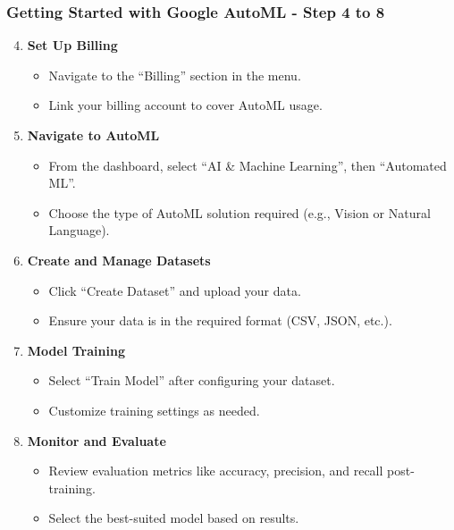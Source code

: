 \documentclass[aspectratio=169]{beamer}
\begin{document}
\begin{frame}[fragile]
    \frametitle{Getting Started with Google AutoML - Step 4 to 8}
    \begin{enumerate}
        \setcounter{enumi}{3}
        \item \textbf{Set Up Billing}
        \begin{itemize}
            \item Navigate to the “Billing” section in the menu.
            \item Link your billing account to cover AutoML usage.
        \end{itemize}

        \item \textbf{Navigate to AutoML}
        \begin{itemize}
            \item From the dashboard, select “AI \& Machine Learning”, then “Automated ML”.
            \item Choose the type of AutoML solution required (e.g., Vision or Natural Language).
        \end{itemize}

        \item \textbf{Create and Manage Datasets}
        \begin{itemize}
            \item Click “Create Dataset” and upload your data.
            \item Ensure your data is in the required format (CSV, JSON, etc.).
        \end{itemize}

        \item \textbf{Model Training}
        \begin{itemize}
            \item Select “Train Model” after configuring your dataset.
            \item Customize training settings as needed.
        \end{itemize}
        
        \item \textbf{Monitor and Evaluate}
        \begin{itemize}
            \item Review evaluation metrics like accuracy, precision, and recall post-training.
            \item Select the best-suited model based on results.
        \end{itemize}
    \end{enumerate}
\end{frame}
\end{document}
